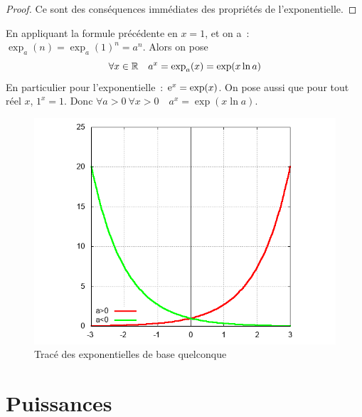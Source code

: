 \begin{proof}
  Ce sont des conséquences immédiates des propriétés de l'exponentielle.
\end{proof}
%
En appliquant la formule précédente en $x=1$, et on a~: $\exp_a(n)=\exp_a(1)^n=a^n$. Alors on pose
\begin{equation}
  \forall x \in \mathbb{R} \quad a^x=\exp_a(x)=\exp(x \ln a)
\end{equation}
En particulier pour l'exponentielle~: $\operatorname{e}^x=\exp(x)$. On pose aussi que pour tout réel $x$, $1^x=1$. Donc $\forall a>0 \ \forall x>0 \quad a^x=\exp(x \ln a)$.
%
\begin{figure}
  \centering
  \includegraphics[scale=0.4,angle=-90]{expa.png}
  \caption{Tracé des exponentielles de base quelconque}
  \label{fig:traceexpa}
\end{figure}
%
\section{Puissances}
\label{sec:chap1-puissances}
